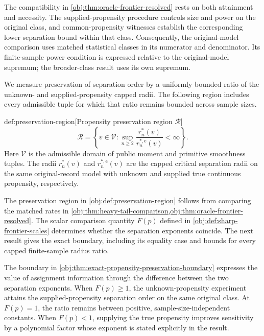 \documentclass[11pt]{article}
\begin{document}
The compatibility in \cref{obj:thm:oracle-frontier-resolved} rests on both attainment and necessity. The supplied-propensity procedure controls size and power on the original class, and common-propensity witnesses establish the corresponding lower separation bound within that class. Consequently, the original-model comparison uses matched statistical classes in its numerator and denominator. Its finite-sample power condition is expressed relative to the original-model supremum; the broader-class result uses its own supremum.

We measure preservation of separation order by a uniformly bounded ratio of the unknown- and supplied-propensity capped radii. The following region includes every admissible tuple for which that ratio remains bounded across sample sizes.

\begin{definitionv}{def:preservation-region}[Propensity preservation region $\mathcal R$]
\[
\mathcal R=
\left\{
v\in\mathcal V:
\sup_{n\ge 2}
\frac{r_n^*(v)}{r_n^{*,\mathrm e}(v)}
<\infty
\right\}.
\]
Here \(\mathcal V\) is the admissible domain of public moment and primitive smoothness tuples. The radii \(r_n^*(v)\) and \(r_n^{*,\mathrm e}(v)\) are the capped critical separation radii on the same original-record model with unknown and supplied true continuous propensity, respectively.
\end{definitionv}

The preservation region  in \cref{obj:def:preservation-region} follows from comparing the matched rates in \cref{obj:thm:heavy-tail-comparison,obj:thm:oracle-frontier-resolved}. The scalar comparison quantity \(F(p)\) defined in \cref{obj:def:sharp-frontier-scales} determines whether the separation exponents coincide. The next result gives the exact boundary, including its equality case and bounds for every capped finite-sample radius ratio.



The boundary in \cref{obj:thm:exact-propensity-preservation-boundary} expresses the value of assignment information through the difference between the two separation exponents. When \(F(p)\ge1\), the unknown-propensity experiment attains the supplied-propensity separation order on the same original class. At \(F(p)=1\), the ratio remains between positive, sample-size-independent constants. When \(F(p)<1\), supplying the true propensity improves sensitivity by a polynomial factor whose exponent is stated explicitly in the result.
\end{document}
